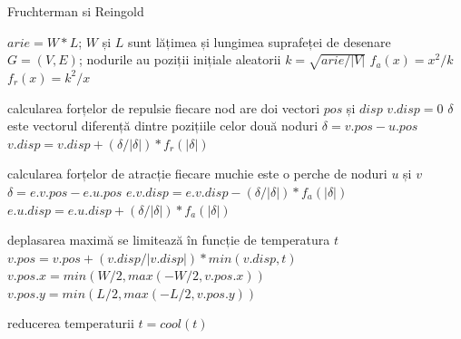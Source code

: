 \begin{algorithm}[H]
    \caption{Fruchterman si Reingold \cite{force}}
    \(arie=W*L\); \(W\) și \(L\) sunt lățimea și lungimea suprafeței de desenare\newline
    \(G=(V,E)\); nodurile au poziții inițiale aleatorii\newline
    \(k=\sqrt{arie/|V|}\) \newline
    \(f_a(x)=x^2/k\)\newline
    \(f_r(x)=k^2/x\)\newline 
    \begin{algorithmic}[1]
            \State calcularea forțelor de repulsie
                \State fiecare nod are doi vectori \(pos\) și \(disp\)
                \State \(v.disp=0\)
                        \State \(\delta\) este vectorul diferență dintre pozițiile celor două noduri
                        \State \(\delta=v.pos-u.pos\)
                        \State \(v.disp=v.disp+(\delta/|\delta|)*f_r(|\delta|)\)
                    \EndIf
                \EndFor
            \EndFor

            \State calcularea forțelor de atracție
                \State fiecare muchie este o perche de noduri \(u\) și \(v\)
                \State \(\delta=e.v.pos-e.u.pos\)
                \State \(e.v.disp=e.v.disp-(\delta/|\delta|)*f_a(|\delta|)\)
                \State \(e.u.disp=e.u.disp+(\delta/|\delta|)*f_a(|\delta|)\)
            \EndFor

            \State deplasarea maximă se limitează în funcție de temperatura \(t\)
                \State \(v.pos=v.pos+(v.disp/|v.disp|)*min(v.disp,t)\)
                \State \(v.pos.x=min(W/2,max(-W/2,v.pos.x))\)
                \State \(v.pos.y=min(L/2,max(-L/2,v.pos.y))\)
            \EndFor

            \State reducerea temperaturii 
            \State \(t=cool(t)\)
        \EndFor
    \end{algorithmic}
\end{algorithm}

  

